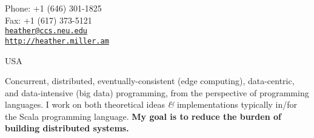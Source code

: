 \documentclass[9pt]{article}
\makeatletter
\def\myemail{heather@ccs.neu.edu}
\def\myweb{http://heather.miller.am}
\def\myfax{+1 (617) 373-5121}
\def\myphone{+1 (646) 301-1825}
\makeatother
\begin{document}
\begin{minipage}[t]{2.95in}

\end{minipage}
\hfill
\hfill
\begin{minipage}[t]{1.7in}
  \flushright \footnotesize Phone: \myphone \\
  Fax: \myfax  \\
  {\scriptsize  \texttt{\href{mailto:\myemail}{\myemail}}} \\
  {\scriptsize  \vspace{-0.03in} \texttt{\href{\myweb}{\myweb}}}
\end{minipage}


\medskip

\reversemarginpar

\medskip
\bigskip


 \noindent USA

 \medskip

\textheight=580pt

\noindent Concurrent, distributed, eventually-consistent (edge computing), data-centric, and data-intensive (big data) programming, from the perspective of programming languages. I work on both theoretical ideas {\em \&} implementations typically in/for the Scala programming language. {\bf My goal is to reduce the burden of building distributed systems.}
\bigskip
\medskip
\end{document}
